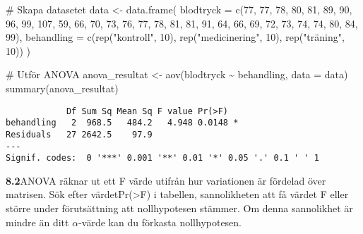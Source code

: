 \documentclass[
  letterpaper,
  DIV=11,
  numbers=noendperiod]{scrartcl}
\newenvironment{Shaded}{\begin{snugshade}}{\end{snugshade}}
\newcommand{\AttributeTok}[1]{\textcolor[rgb]{0.40,0.45,0.13}{#1}}
\newcommand{\CommentTok}[1]{\textcolor[rgb]{0.37,0.37,0.37}{#1}}
\newcommand{\DecValTok}[1]{\textcolor[rgb]{0.68,0.00,0.00}{#1}}
\newcommand{\FunctionTok}[1]{\textcolor[rgb]{0.28,0.35,0.67}{#1}}
\newcommand{\NormalTok}[1]{\textcolor[rgb]{0.00,0.23,0.31}{#1}}
\newcommand{\OtherTok}[1]{\textcolor[rgb]{0.00,0.23,0.31}{#1}}
\newcommand{\SpecialCharTok}[1]{\textcolor[rgb]{0.37,0.37,0.37}{#1}}
\newcommand{\StringTok}[1]{\textcolor[rgb]{0.13,0.47,0.30}{#1}}
\begin{document}
\begin{Shaded}
\begin{Highlighting}[]
\CommentTok{\# Skapa datasetet}
\NormalTok{data }\OtherTok{\textless{}{-}} \FunctionTok{data.frame}\NormalTok{(}
  \AttributeTok{blodtryck =} \FunctionTok{c}\NormalTok{(}\DecValTok{77}\NormalTok{, }\DecValTok{77}\NormalTok{, }\DecValTok{78}\NormalTok{, }\DecValTok{80}\NormalTok{, }\DecValTok{81}\NormalTok{, }\DecValTok{89}\NormalTok{, }\DecValTok{90}\NormalTok{, }\DecValTok{96}\NormalTok{, }\DecValTok{99}\NormalTok{, }\DecValTok{107}\NormalTok{,}
  \DecValTok{59}\NormalTok{, }\DecValTok{66}\NormalTok{, }\DecValTok{70}\NormalTok{, }\DecValTok{73}\NormalTok{, }\DecValTok{76}\NormalTok{, }\DecValTok{77}\NormalTok{, }\DecValTok{78}\NormalTok{, }\DecValTok{81}\NormalTok{, }\DecValTok{81}\NormalTok{, }\DecValTok{91}\NormalTok{,}
  \DecValTok{64}\NormalTok{, }\DecValTok{66}\NormalTok{, }\DecValTok{69}\NormalTok{, }\DecValTok{72}\NormalTok{, }\DecValTok{73}\NormalTok{, }\DecValTok{74}\NormalTok{, }\DecValTok{74}\NormalTok{, }\DecValTok{80}\NormalTok{, }\DecValTok{84}\NormalTok{, }\DecValTok{99}\NormalTok{),}
  \AttributeTok{behandling =} \FunctionTok{c}\NormalTok{(}\FunctionTok{rep}\NormalTok{(}\StringTok{"kontroll"}\NormalTok{, }\DecValTok{10}\NormalTok{), }\FunctionTok{rep}\NormalTok{(}\StringTok{"medicinering"}\NormalTok{, }\DecValTok{10}\NormalTok{), }\FunctionTok{rep}\NormalTok{(}\StringTok{"träning"}\NormalTok{, }\DecValTok{10}\NormalTok{))}
\NormalTok{)}

\CommentTok{\# Utför ANOVA}
\NormalTok{anova\_resultat }\OtherTok{\textless{}{-}} \FunctionTok{aov}\NormalTok{(blodtryck }\SpecialCharTok{\textasciitilde{}}\NormalTok{ behandling, }\AttributeTok{data =}\NormalTok{ data)}
\FunctionTok{summary}\NormalTok{(anova\_resultat)}
\end{Highlighting}
\end{Shaded}

\begin{verbatim}
            Df Sum Sq Mean Sq F value Pr(>F)  
behandling   2  968.5   484.2   4.948 0.0148 *
Residuals   27 2642.5    97.9                 
---
Signif. codes:  0 '***' 0.001 '**' 0.01 '*' 0.05 '.' 0.1 ' ' 1
\end{verbatim}

\textbf{8.2}ANOVA räknar ut ett F värde utifrån hur variationen är
fördelad över matrisen. Sök efter värdetPr(\textgreater F) i tabellen,
sannolikheten att få värdet F eller större under förutsättning att
nollhypotesen stämmer. Om denna sannolikhet är mindre än ditt
\(α\)-värde kan du förkasta nollhypotesen.
\end{document}
